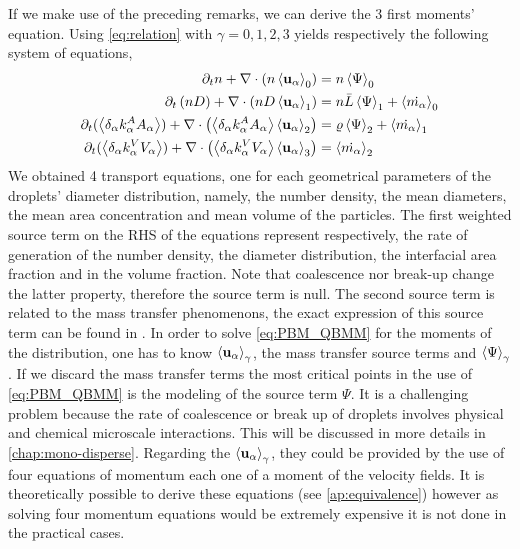 If we make use of the preceding remarks, we can derive the 3 first moments' equation. 
Using \ref{eq:relation} with $\gamma = 0,1,2,3$ yields respectively the following system of equations,
\begin{align}
    \label{eq:PBM_QBMM3}
    \pddt n  
    + \grad \cdot \left(n\gavg[0]{\textbf{u}_\alpha}\right) 
    &= n\gavg[0]{\Psi}\\
    \label{eq:PBEsize}
    \pddt \left(nD\right)
    + \grad \cdot \left(nD\gavg[1]{\textbf{u}_\alpha}\right) 
    &= n\bar{L}\gavg[1]{\Psi}+ \gavg[0]{\dot{m_\alpha}} \\
    \label{eq:PBEarea} 
    \pddt ( \pavg{k_\alpha^A A_\alpha} ) 
    + \grad \cdot \left( \pavg{k_\alpha^A A_\alpha} \gavg[2]{\textbf{u}_\alpha}\right) 
    &= \varrho\gavg[2]{\Psi} + \gavg[1]{\dot{m_\alpha}}\\
    \label{eq:PBEmass}
    \pddt (\pavg{ k_\alpha^V  V_\alpha} )
    + \grad \cdot \left( \pavg{k_\alpha^V V_\alpha}  \gavg[3]{\textbf{u}_\alpha}\right) 
    &=  \gavg[2]{\dot{m_\alpha}}
\end{align}
We obtained 4 transport equations, one for each geometrical parameters of the droplets' diameter distribution, namely, the number density, the mean diameters, the mean area concentration and mean volume of the particles.
The first weighted source term on the RHS of the equations represent respectively, the rate of generation of the number density, the diameter distribution, the interfacial area fraction and in the volume fraction. 
Note that coalescence nor break-up change the latter property, therefore the source term is null. 
The second source term is related to the mass transfer phenomenons, the exact expression of this source term can be found in \citep{zaepffel2011modelisation}. 
In order to solve \ref{eq:PBM_QBMM} for the moments of the distribution, one has to know $\left<\textbf{u}_\alpha\right>_{\gamma}$, the mass transfer source terms and $\left<\Psi\right>_{\gamma}$.
If we discard the mass transfer terms the most critical points in the use of \ref{eq:PBM_QBMM} is the modeling of the source term $\Psi$.
It is a challenging problem because the rate of coalescence or break up of droplets involves physical and chemical microscale interactions.
This will be discussed in more details in \ref{chap:mono-disperse}.
Regarding the $\left<\textbf{u}_\alpha\right>_{\gamma}$, they could be provided by the use of four equations of momentum each one of a moment of the velocity fields.  
It is theoretically possible to derive these equations (see \ref{ap:equivalence}) however as solving four momentum equations would be extremely expensive it is not done in the practical cases. 
